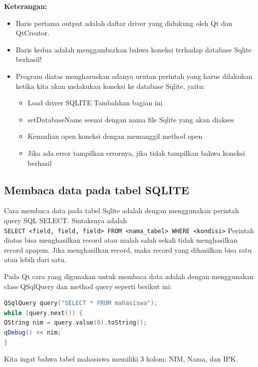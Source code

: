 \textbf{Keterangan:}

\begin{itemize}

\item
  Baris pertama output adalah daftar driver yang didukung oleh Qt dan
  QtCreator.
\item
  Baris kedua adalah menggambarkan bahwa koneksi terhadap database
  Sqlite berhasil!
\item
  Program diatas mengharuskan adanya urutan perintah yang harus
  dilakukan ketika kita akan melakukan koneksi ke database Sqlite,
  yaitu: 

\begin{itemize}
\item Load driver SQLITE Tambahkan bagian ini
\item setDatabaseName sesuai dengan nama file Sqlite yang akan diakses 
\item Kemudian open koneksi dengan memanggil method open 
\item Jika ada error tampilkan errornya, jika tidak tampilkan bahwa koneksi berhasil
\end{itemize}  

\end{itemize}

\subsection{Membaca data pada tabel SQLITE}

Cara membaca data pada tabel Sqlite adalah dengan menggunakan perintah
query SQL SELECT. Sintaksnya adalah
\texttt{SELECT\ \textless{}field,\ field,\ field\textgreater{}\ FROM\ \textless{}nama\_tabel\textgreater{}\ WHERE\ \textless{}kondisi\textgreater{}}
Perintah diatas bisa menghasilkan record atau malah salah sekali tidak
menghasilkan record apapun. Jika menghasilkan record, maka record yang
dihasilkan bisa satu atau lebih dari satu.

Pada Qt cara yang digunakan untuk membaca data adalah dengan menggunakan
class QSqlQuery dan method query seperti berikut ini:

\begin{lstlisting}[language=c++, numbers=none]
QSqlQuery query("SELECT * FROM mahasiswa");
while (query.next()) {
QString nim = query.value(0).toString();
qDebug() << nim;
}
\end{lstlisting}

Kita ingat bahwa tabel mahasiswa memiliki 3 kolom: NIM, Nama, dan IPK.

